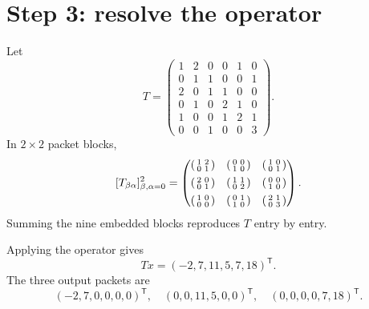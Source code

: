 \documentclass[11pt,oneside]{book}
\theoremstyle{definition}
\theoremstyle{remark}
\begin{document}
\section{Step 3: resolve the operator}
Let
\[
T=
\begin{pmatrix}
1&2&0&0&1&0\\
0&1&1&0&0&1\\
2&0&1&1&0&0\\
0&1&0&2&1&0\\
1&0&0&1&2&1\\
0&0&1&0&0&3
\end{pmatrix}.
\]
In $2\times2$ packet blocks,
\[
[T_{\beta\alpha}]_{\beta,\alpha=0}^2=
\begin{pmatrix}
\begin{psmallmatrix}1&2\\0&1\end{psmallmatrix}&
\begin{psmallmatrix}0&0\\1&0\end{psmallmatrix}&
\begin{psmallmatrix}1&0\\0&1\end{psmallmatrix}\\[4pt]
\begin{psmallmatrix}2&0\\0&1\end{psmallmatrix}&
\begin{psmallmatrix}1&1\\0&2\end{psmallmatrix}&
\begin{psmallmatrix}0&0\\1&0\end{psmallmatrix}\\[4pt]
\begin{psmallmatrix}1&0\\0&0\end{psmallmatrix}&
\begin{psmallmatrix}0&1\\1&0\end{psmallmatrix}&
\begin{psmallmatrix}2&1\\0&3\end{psmallmatrix}
\end{pmatrix}.
\]
Summing the nine embedded blocks reproduces $T$ entry by entry.

Applying the operator gives
\[
Tx=(-2,7,11,5,7,18)^{\mathsf T}.
\]
The three output packets are
\[
(-2,7,0,0,0,0)^{\mathsf T},
\quad
(0,0,11,5,0,0)^{\mathsf T},
\quad
(0,0,0,0,7,18)^{\mathsf T}.
\]
\end{document}
